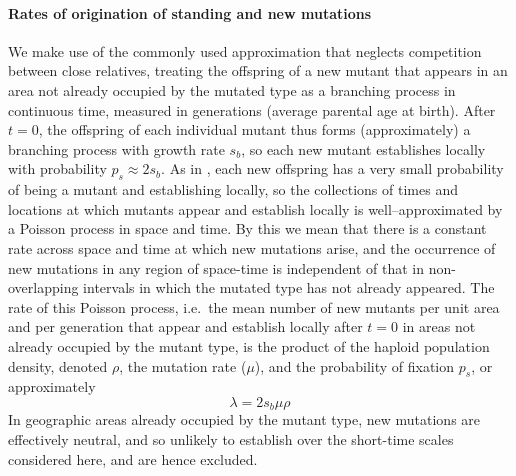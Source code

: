 \documentclass{article}
\begin{document}
\paragraph{Rates of origination of standing and new mutations}
We make use of the commonly used approximation that neglects competition between close relatives,
treating the offspring of a new mutant that appears in an area not already occupied by the mutated type
as a branching process in continuous time, measured in generations
(average parental age at birth). 
After $t=0$, the offspring of each individual mutant thus forms (approximately) a branching process with growth rate $s_b$,
so each new mutant establishes locally with probability $p_s \approx 2s_b$.
As in \cite{ralphcoop2010}, each new offspring has a very small probability of being a mutant and establishing locally,
so the collections of times and locations at which mutants appear and establish locally 
is well--approximated by a Poisson process in space and time.
By this we mean that there is a constant rate across space and
  time at which new
  mutations arise, and the occurrence of new mutations in any region of
  space-time is independent of that in non-overlapping intervals
  in which the mutated type has not already appeared.
The rate of this Poisson process,
i.e.\ the mean number of new mutants per unit area and per generation that
appear and establish locally after $t=0$ in areas not already occupied by the mutant type,
is the product of the haploid population density, denoted $\rho$,
the mutation rate ($\mu$),
and the probability of fixation $p_s$, or
approximately 
\begin{equation}
\lambda = 2 s_b \mu \rho 
\end{equation}
In geographic areas already occupied by the mutant type, 
 new mutations are effectively neutral, and so unlikely to establish over the
 short-time scales considered here, and are hence excluded.  
\end{document}
